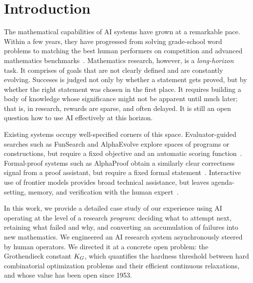 \section{Introduction}
\label{sec:intro}

The mathematical capabilities of AI systems have grown at a remarkable pace.
Within a few years, they have progressed from solving grade-school word problems to matching the best human performers on competition and advanced mathematics benchmarks~\cite{hubert2026alphaproof, imo-gold, glazer2024frontiermath}.
Mathematics research, however, is a \emph{long-horizon} task.
It comprises of goals that are not clearly defined and are constantly evolving. 
Succeses is judged not only by whether a statement gets proved, but by whether the right statement was chosen in the first place. 
It requires building a body of knowledge whose significance might not be apparent until much later; that is, in research, rewards are sparse, and often delayed.
It is still an open question how to use AI effectively at this horizon.

Existing systems occupy well-specified corners of this space.
Evaluator-guided searches such as FunSearch and AlphaEvolve explore spaces of programs or constructions, but require a fixed objective and an automatic scoring function~\cite{funsearch,novikov2025alphaevolvecodingagentscientific}.
Formal-proof systems such as AlphaProof obtain a similarly clear correctness signal from a proof assistant, but require a fixed formal statement~\cite{hubert2026alphaproof}.
Interactive use of frontier models provides broad technical assistance, but leaves agenda-setting, memory, and verification with the human expert~\cite{bubeck2025science}.

In this work, we provide a detailed case study of our experience using AI operating at the level of a research \emph{program}: deciding what to attempt next, retaining what failed and why, and converting an accumulation of failures into new mathematics.
We engineered an AI research system asynchronously steered by human operators.
We directed it at a concrete open problem: the Grothendieck constant $K_G$, which quantifies the hardness threshold between hard combinatorial optimization problems and their efficient continuous relaxations, and whose value has been open since 1953.

